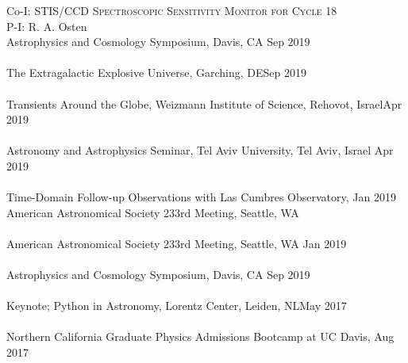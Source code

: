 \documentclass[10pt]{cv}
\begin{document}
\begin{llist}
Co-I: \textsc{STIS/CCD Spectroscopic Sensitivity Monitor for Cycle 18} \\
P-I: R. A. Osten\\%
\vspace{-0.1in}  
Astrophysics and Cosmology Symposium, Davis, CA \hfill Sep 2019\\\vspace{-0.1in}  
\\
The Extragalactic Explosive Universe, Garching, DE\hfill Sep 2019\\ \vspace{-0.1in}  
\\
Transients Around the Globe, Weizmann Institute of Science, Rehovot, Israel\hfill Apr 2019\\ \vspace{-0.1in}  %
\\
Astronomy and Astrophysics Seminar, Tel Aviv University, Tel Aviv, Israel \hfill Apr 2019\\ \vspace{-0.1in}  %
\\
Time-Domain Follow-up Observations with Las Cumbres Observatory,   \hfill Jan 2019\\ 
American Astronomical Society 233rd Meeting, Seattle, WA \\ \vspace{-0.1in}  %
\\
American Astronomical Society 233rd Meeting,  Seattle, WA \hfill Jan 2019\\\vspace{-0.1in}  
\\
Astrophysics and Cosmology Symposium, Davis, CA \hfill Sep 2019\\\vspace{-0.1in}  
\\
Keynote; Python in Astronomy, Lorentz Center, Leiden, NL\hfill May 2017\\ \vspace{-0.1in}  %
\\
Northern California Graduate Physics Admissions Bootcamp at UC Davis, \hfill Aug 2017\\ 

\end{llist}
\end{document}
